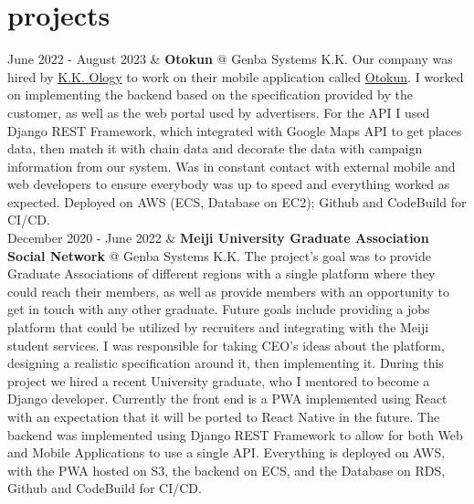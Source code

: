 \documentclass[]{cv-roald}
\begin{document}
                    
    

\section*{projects}
\begin{tabularcv}
    June 2022 - August 2023 &       \textbf{Otokun} @ Genba Systems K.K.\newline 
                                Our company was hired by \href{https://www.ology.co.jp/}{K.K. Ology} to work on their mobile application called \href{https://www.otokun.jp/}{Otokun}. I worked on implementing the backend based on the specification provided by the customer, as well as the web portal used by advertisers. For the API I used Django REST Framework, which integrated with Google Maps API to get places data, then match it with chain data and decorate the data with campaign information from our system. Was in constant contact with external mobile and web developers to ensure everybody was up to speed and everything worked as expected.
                                \newline Deployed on AWS (ECS, Database on EC2); Github and CodeBuild for CI/CD.
                                \\[\vspacepar]
    December 2020 - June 2022 &       \textbf{Meiji University Graduate Association Social Network} @ Genba Systems K.K.\newline 
                                The project's goal was to provide Graduate Associations of different regions with a single platform where they could reach their members, as well as provide members with an opportunity to get in touch with any other graduate. Future goals include providing a jobs platform that could be utilized by recruiters and integrating with the Meiji student services. I was responsible for taking CEO's ideas about the platform, designing a realistic specification around it, then implementing it. During this project we hired a recent University graduate, who I mentored to become a Django developer.  
                                \newline Currently the front end is a PWA implemented using React with an expectation that it will be ported to React Native in the future. The backend was implemented using Django REST Framework to allow for both Web and Mobile Applications to use a single API. Everything is deployed on AWS, with the PWA hosted on S3, the backend on ECS, and the Database on RDS, Github and CodeBuild for CI/CD.
                                \\[\vspacepar]

\end{tabularcv}
\end{document}
